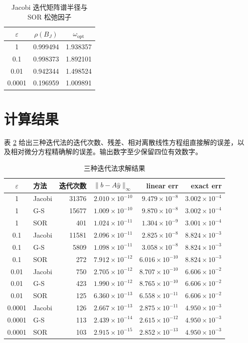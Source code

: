 \documentclass[a4paper,11pt]{article}
\begin{document}
\begin{table}[H]
\centering
\caption{Jacobi 迭代矩阵谱半径与 SOR 松弛因子}
\label{tab:omega}
\begin{tabular}{ccc}
\toprule
$\varepsilon$ & $\rho(B_J)$ & $\omega_{\mathrm{opt}}$ \\
\midrule
1       & 0.999494 & 1.938357 \\
0.1     & 0.998373 & 1.892101 \\
0.01    & 0.942344 & 1.498524 \\
0.0001  & 0.196959 & 1.009891 \\
\bottomrule
\end{tabular}
\end{table}

\section{计算结果}
表 \ref{tab:iterations} 给出三种迭代法的迭代次数、残差、相对离散线性方程组直接解的误差，以及相对微分方程精确解的误差。输出数字至少保留四位有效数字。

\begin{table}[H]
\centering
\small
\caption{三种迭代法求解结果}
\label{tab:iterations}
\begin{tabular}{clrrrr}
\toprule
$\varepsilon$ & 方法 & 迭代次数 & $\|b-A\hat y\|_\infty$ & linear err & exact err \\
\midrule
1 & Jacobi & 31376 & $2.010\times10^{-10}$ & $9.479\times10^{-8}$ & $3.002\times10^{-4}$ \\
1 & G-S & 15677 & $1.009\times10^{-10}$ & $9.870\times10^{-8}$ & $3.002\times10^{-4}$ \\
1 & SOR & 401 & $1.024\times10^{-11}$ & $1.304\times10^{-9}$ & $3.001\times10^{-4}$ \\
\midrule
0.1 & Jacobi & 11581 & $2.096\times10^{-11}$ & $2.825\times10^{-8}$ & $8.824\times10^{-3}$ \\
0.1 & G-S & 5809 & $1.098\times10^{-11}$ & $3.058\times10^{-8}$ & $8.824\times10^{-3}$ \\
0.1 & SOR & 272 & $7.912\times10^{-12}$ & $6.016\times10^{-10}$ & $8.824\times10^{-3}$ \\
\midrule
0.01 & Jacobi & 750 & $2.705\times10^{-12}$ & $8.707\times10^{-10}$ & $6.606\times10^{-2}$ \\
0.01 & G-S & 423 & $1.990\times10^{-12}$ & $8.765\times10^{-10}$ & $6.606\times10^{-2}$ \\
0.01 & SOR & 125 & $6.360\times10^{-13}$ & $6.558\times10^{-11}$ & $6.606\times10^{-2}$ \\
\midrule
0.0001 & Jacobi & 126 & $2.667\times10^{-13}$ & $2.875\times10^{-11}$ & $4.950\times10^{-3}$ \\
0.0001 & G-S & 113 & $2.439\times10^{-14}$ & $2.615\times10^{-12}$ & $4.950\times10^{-3}$ \\
0.0001 & SOR & 103 & $2.915\times10^{-15}$ & $2.852\times10^{-13}$ & $4.950\times10^{-3}$ \\
\bottomrule
\end{tabular}
\end{table}
\end{document}
